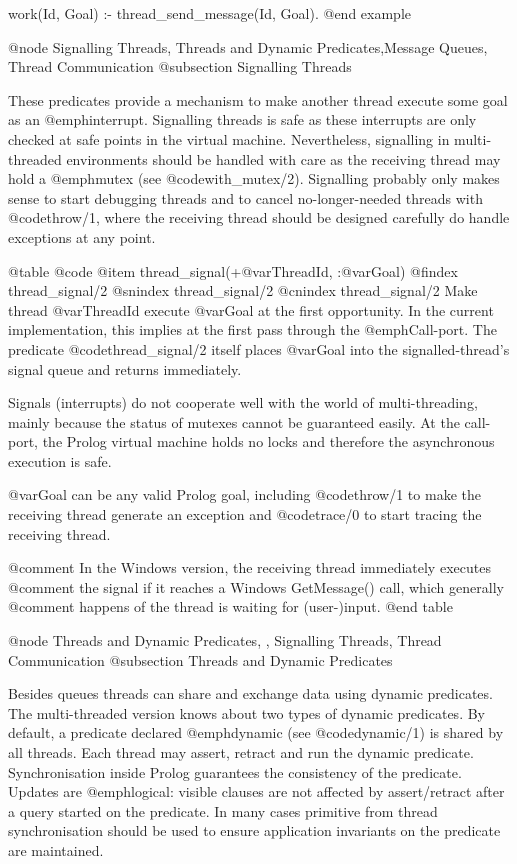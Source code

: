 {{{{{{{{{%
%	

work(Id, Goal) :-
	thread_send_message(Id, Goal).
@end example

@node Signalling Threads, Threads and Dynamic Predicates,Message Queues, Thread Communication
@subsection Signalling Threads

These predicates provide a mechanism to make another thread execute some
goal as an @emph{interrupt}.  Signalling threads is safe as these
interrupts are only checked at safe points in the virtual machine.
Nevertheless, signalling in multi-threaded environments should be
handled with care as the receiving thread may hold a @emph{mutex}
(see @code{with_mutex/2}).  Signalling probably only makes sense to start
debugging threads and to cancel no-longer-needed threads with @code{throw/1},
where the receiving thread should be designed carefully do handle
exceptions at any point.

@table @code
@item thread_signal(+@var{ThreadId}, :@var{Goal})
@findex thread_signal/2
@snindex thread_signal/2
@cnindex thread_signal/2
Make thread @var{ThreadId} execute @var{Goal} at the first
opportunity.  In the current implementation, this implies at the first
pass through the @emph{Call-port}. The predicate @code{thread_signal/2}
itself places @var{Goal} into the signalled-thread's signal queue
and returns immediately.

Signals (interrupts) do not cooperate well with the world of
multi-threading, mainly because the status of mutexes cannot be
guaranteed easily.  At the call-port, the Prolog virtual machine
holds no locks and therefore the asynchronous execution is safe.

@var{Goal} can be any valid Prolog goal, including @code{throw/1} to make
the receiving thread generate an exception and @code{trace/0} to start
tracing the receiving thread.

@comment In the Windows version, the receiving thread immediately executes
@comment the signal if it reaches a Windows GetMessage() call, which generally
@comment happens of the thread is waiting for (user-)input.
@end table

@node Threads and Dynamic Predicates, , Signalling Threads, Thread Communication
@subsection Threads and Dynamic Predicates

Besides queues threads can share and exchange data using dynamic
predicates. The multi-threaded version knows about two types of
dynamic predicates. By default, a predicate declared @emph{dynamic}
(see @code{dynamic/1}) is shared by all threads. Each thread may
assert, retract and run the dynamic predicate. Synchronisation inside
Prolog guarantees the consistency of the predicate. Updates are
@emph{logical}: visible clauses are not affected by assert/retract
after a query started on the predicate. In many cases primitive from
thread synchronisation should be used to ensure application invariants on
the predicate are maintained.

}}}}}}}}}
